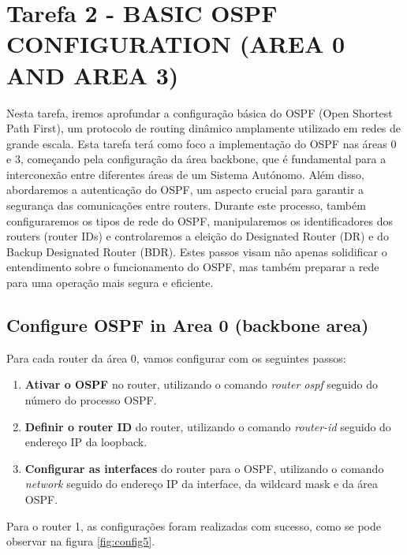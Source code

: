 \documentclass[11pt,english, openright, oneside]{book}
\begin{document}
\section{Tarefa 2 - BASIC OSPF CONFIGURATION (AREA 0 AND AREA 3)}
\vspace{0.2cm}
Nesta tarefa, iremos aprofundar a configuração básica do OSPF (Open Shortest Path First), um protocolo de routing dinâmico amplamente utilizado em redes de grande escala. Esta tarefa terá como foco a implementação do OSPF nas áreas 0 e 3, começando pela configuração da área backbone, que é fundamental para a interconexão entre diferentes áreas de um Sistema Autónomo. Além disso, abordaremos a autenticação do OSPF, um aspecto crucial para garantir a segurança das comunicações entre routers. Durante este processo, também configuraremos os tipos de rede do OSPF, manipularemos os identificadores dos routers (router IDs) e controlaremos a eleição do Designated Router (DR) e do Backup Designated Router (BDR). Estes passos visam não apenas solidificar o entendimento sobre o funcionamento do OSPF, mas também preparar a rede para uma operação mais segura e eficiente.
\vspace{0.2cm}

\subsection{Configure OSPF in Area 0 (backbone area)}
\vspace{0.2cm}

Para cada router da área 0, vamos configurar com os seguintes passos:
\begin{enumerate}
  \item \textbf{Ativar o OSPF} no router, utilizando o comando \textit{router ospf} seguido do número do processo OSPF.
  \item \textbf{Definir o router ID} do router, utilizando o comando \textit{router-id} seguido do endereço IP da loopback.
  \item \textbf{Configurar as interfaces} do router para o OSPF, utilizando o comando \textit{network} seguido do endereço IP da interface, da wildcard mask e da área OSPF.
\end{enumerate}
\vspace{0.2cm}

Para o router 1, as configurações foram realizadas com sucesso, como se pode observar na figura \ref{fig:config5}.
\vspace{0.2cm}
\end{document}
